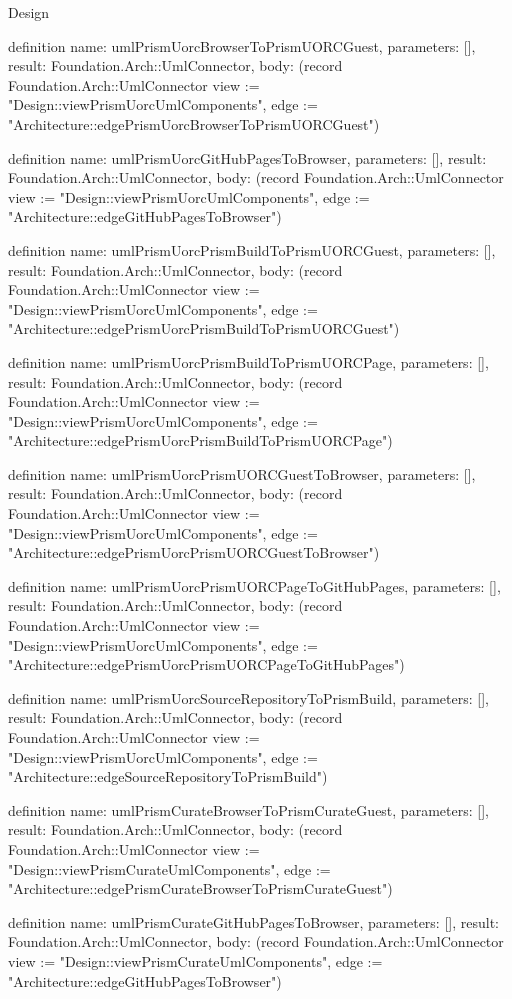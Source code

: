 \begin{lexlean}{Design}
\begin{semanticmodule}
definition{
  name: umlPrismUorcBrowserToPrismUORCGuest,
  parameters: [],
  result: Foundation.Arch::UmlConnector,
  body: (record Foundation.Arch::UmlConnector {view := "Design::viewPrismUorcUmlComponents", edge := "Architecture::edgePrismUorcBrowserToPrismUORCGuest"})
}

definition{
  name: umlPrismUorcGitHubPagesToBrowser,
  parameters: [],
  result: Foundation.Arch::UmlConnector,
  body: (record Foundation.Arch::UmlConnector {view := "Design::viewPrismUorcUmlComponents", edge := "Architecture::edgeGitHubPagesToBrowser"})
}

definition{
  name: umlPrismUorcPrismBuildToPrismUORCGuest,
  parameters: [],
  result: Foundation.Arch::UmlConnector,
  body: (record Foundation.Arch::UmlConnector {view := "Design::viewPrismUorcUmlComponents", edge := "Architecture::edgePrismUorcPrismBuildToPrismUORCGuest"})
}

definition{
  name: umlPrismUorcPrismBuildToPrismUORCPage,
  parameters: [],
  result: Foundation.Arch::UmlConnector,
  body: (record Foundation.Arch::UmlConnector {view := "Design::viewPrismUorcUmlComponents", edge := "Architecture::edgePrismUorcPrismBuildToPrismUORCPage"})
}

definition{
  name: umlPrismUorcPrismUORCGuestToBrowser,
  parameters: [],
  result: Foundation.Arch::UmlConnector,
  body: (record Foundation.Arch::UmlConnector {view := "Design::viewPrismUorcUmlComponents", edge := "Architecture::edgePrismUorcPrismUORCGuestToBrowser"})
}

definition{
  name: umlPrismUorcPrismUORCPageToGitHubPages,
  parameters: [],
  result: Foundation.Arch::UmlConnector,
  body: (record Foundation.Arch::UmlConnector {view := "Design::viewPrismUorcUmlComponents", edge := "Architecture::edgePrismUorcPrismUORCPageToGitHubPages"})
}

definition{
  name: umlPrismUorcSourceRepositoryToPrismBuild,
  parameters: [],
  result: Foundation.Arch::UmlConnector,
  body: (record Foundation.Arch::UmlConnector {view := "Design::viewPrismUorcUmlComponents", edge := "Architecture::edgeSourceRepositoryToPrismBuild"})
}

definition{
  name: umlPrismCurateBrowserToPrismCurateGuest,
  parameters: [],
  result: Foundation.Arch::UmlConnector,
  body: (record Foundation.Arch::UmlConnector {view := "Design::viewPrismCurateUmlComponents", edge := "Architecture::edgePrismCurateBrowserToPrismCurateGuest"})
}

definition{
  name: umlPrismCurateGitHubPagesToBrowser,
  parameters: [],
  result: Foundation.Arch::UmlConnector,
  body: (record Foundation.Arch::UmlConnector {view := "Design::viewPrismCurateUmlComponents", edge := "Architecture::edgeGitHubPagesToBrowser"})
}


\end{semanticmodule}
\end{lexlean}
